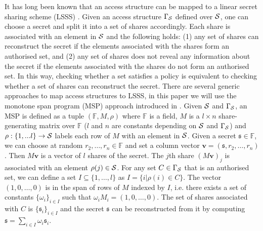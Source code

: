 It has long been known that an access structure can be mapped to a linear secret sharing scheme (LSSS) \cite{ito89,bei96}. Given an access structure $\Gamma_\mathcal{S}$ defined over $\mathcal{S}$, one can choose a secret and split it into a set of shares accordingly. 
Each share is associated with an element in $\mathcal{S}$ and the following holds: 
(1) any set of shares can reconstruct the secret if the elements associated with the shares form an authorised set, and 
(2) any set of shares does not reveal any information about the secret if the elements associated with the shares do not form an authorised set.
In this way, checking whether a set satisfies a policy is equivalent to checking whether a set of shares can reconstruct the secret. 
There are several generic approaches to map access structures to LSSS, in this paper we will use the monotone span program (MSP) approach introduced in \cite{bei96}. 
Given $\mathcal{S}$ and $\Gamma_\mathcal{S}$, an MSP is defined as a tuple $(\mathbb{F},M,\rho)$ where $\mathbb{F}$ is a field, $M$ is a $l\times n$ share-generating matrix over $\mathbb{F}$ ($l$ and $n$ are constants depending on  $\mathcal{S}$ and $\Gamma_\mathcal{S}$) and $\rho:\{1,...l\}\rightarrow \mathcal{S}$ labels each row of $M$ with an element in $\mathcal{S}$. 
Given a secret $\mathfrak{s}\in \mathbb{F}$, we can choose at random $r_2,\ldots,r_n \in \mathbb{F}$ and set a column vector $\mathbf{v}=(\mathfrak{s},r_2,\ldots,r_n)$. 
Then $M\mathbf{v}$ is a vector of $l$ shares of the secret. 
The $j$th share $(M\mathbf{v})_{j}$ is associated with an element $\rho(j) \in \mathcal{S}$. 
For any set $C\in \Gamma_\mathcal{S}$ that is an authorised set, we can define a set $I\subseteq \{1,\ldots,l\}$ as $I=\{i|\rho(i)\in C\}$. 
The vector $(1,0,\ldots,0)$ is in the span of rows of $M$ indexed by $I$, i.e. there exists a set of constants $\{\omega_i\}_{i\in I}$ such that $\omega_iM_i=(1,0,\ldots,0)$. 
The set of shares associated with $C$ is $\{\mathfrak{s}_i\}_{i\in I}$ and the secret $\mathfrak{s}$ can be reconstructed from it by computing $\mathfrak{s}=\sum_{i\in I}\omega_i\mathfrak{s}_i$.

